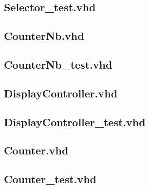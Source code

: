 \documentclass[10pt,spanish,a4paper,openany,notitlepage]{article}
\begin{document}
\subsection{Selector\_test.vhd}

\newpage



\subsection{CounterNb.vhd}

\newpage

\subsection{CounterNb\_test.vhd}

\newpage



\subsection{DisplayController.vhd}

\newpage

\subsection{DisplayController\_test.vhd}

\newpage



\subsection{Counter.vhd}

\newpage



\subsection{Counter\_test.vhd}

\newpage
\end{document}

